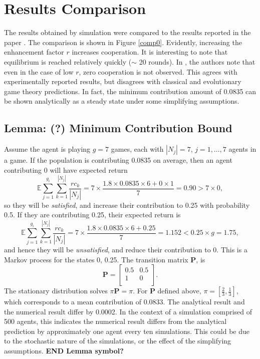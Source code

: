 \section{Results Comparison}
The results obtained by simulation were compared to the results reported in the paper \cite{RN49}. The comparison is shown in Figure \ref{comp0}. Evidently, increasing the enhancement factor $r$ increases cooperation. It is interesting to note that equilibrium is reached relatively quickly ($\sim$ 20 rounds). In \cite{RN49}, the authors note that even in the case of low $r$, zero cooperation is not observed. This agrees with experimentally reported results, but disagrees with classical and evolutionary game theory predictions. In fact, the minimum contribution amount of 0.0835 can be shown analytically as a steady state under some simplifying assumptions.\\

\subsection{Lemma: (?) Minimum Contribution Bound} \label{min_contribution_lemma}
Assume the agent is playing $g=7$ games, each with $|N_j|=7$, $j=1, \dots, 7$ agents in a game. If the population is contributing 0.0835 on average, then  an agent contributing 0 will have expected return $$ \mathbb E \sum_{j=1}^{g_i} \sum_{k=1}^{|N_j|} \frac{rc_k}{|N_j|} =   7\times\frac{1.8\times0.0835\times6 + 0\times1}{7} =  0.90 >7\times0,$$ so they will be \emph{satisfied}, and increase their contribution to 0.25 with probability 0.5. If they are contributing 0.25, their expected return is 
$$ \mathbb E \sum_{j=1}^{g_i} \sum_{k=1}^{|N_j|} \frac{rc_k}{|N_j|} =7\times \frac{1.8\times0.0835\times6 + 0.25}{7} = 1.152< 0.25\times g  =1.75, $$
 and hence they will be \emph{unsatisfied}, and reduce their contribution to 0. This is a Markov process for the states 0, 0.25. The transition matrix $\mathbf{P}$, is $$\mathbf P = \begin{bmatrix} 0.5& 0.5 \\
1& 0 \\
\end{bmatrix}. $$ The stationary distribution solves $\pi \mathbf{P} = \pi$. For $\mathbf{P}$ defined above, $\pi = [\tfrac{2}{3}, \tfrac{1}{3}]$, which corresponds to a mean contribution of 0.0833. The analytical result and the numerical result differ by 0.0002. In the context of a simulation comprised of 500 agents, this indicates the numerical result differs from the analytical prediction by approximately one agent every ten simulations. This could be due to the stochastic nature of the simulations, or the effect of the simplifying assumptions. \textbf{END Lemma symbol? } \halmos\\

